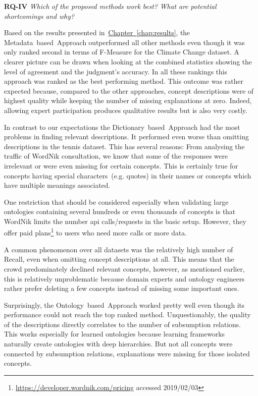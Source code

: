 \textbf{RQ-IV} \emph{Which of the proposed methods work best? What are potential shortcomings and why?} 

Based on the results presented in~\hyperref[chap:results]{Chapter~\ref*{chap:results}}, the Metadata~based~Approach outperformed all other methods even though it was only ranked second in terms of F-Measure for the Climate Change dataset. A clearer picture can be drawn when looking at the combined statistics showing the level of agreement and the judgment's accuracy. In all these rankings this approach was ranked as the best performing method. This outcome was rather expected because, compared to the other approaches, concept descriptions were of highest quality while keeping the number of missing explanations at zero. Indeed, allowing expert participation produces qualitative results but is also very costly.  

In contrast to our expectations the Dictionary~based~Approach had the most problems in finding relevant descriptions. It performed even worse than omitting descriptions in the tennis dataset. This has several reasons: From analysing the traffic of WordNik consultation, we know that some of the responses were irrelevant or were even missing for certain concepts. This is certainly true for concepts having special characters~(e.g. quotes) in their names or concepts which have multiple meanings associated. 

One restriction that should be considered especially when validating large ontologies containing several hundreds or even thousands of concepts is that WordNik limits the number \gls{api} calls/requests in the basic setup. However, they offer paid plans\footnote{\url{https://developer.wordnik.com/pricing} accessed 2019/02/03} to users who need more calls or more data.

A common phenomenon over all datasets was the relatively high number of Recall, even when omitting concept descriptions at all. This means that the crowd predominately declined relevant concepts, however, as mentioned earlier, this is relatively unproblematic because domain experts and ontology engineers rather prefer deleting a few concepts instead of missing some important ones. 

Surprisingly, the Ontology~based~Approach worked pretty well even though its performance could not reach the top ranked method. Unquestionably,
the quality of the descriptions directly correlates to the number of subsumption relations. This works especially for learned ontologies because learning frameworks naturally create ontologies with deep hierarchies. But not all concepts were connected by subsumption relations, explanations were missing for those isolated concepts. 



